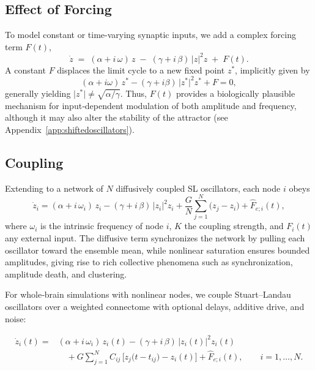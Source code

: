 \documentclass[12pt]{article}
\numberwithin{equation}{section}
\begin{document}
\subsection {Effect of Forcing}
To model constant or time-varying synaptic inputs, we add a complex forcing term $F(t)$,
\begin{equation}
\dot{z} \;=\; (\alpha + i\,\omega)\,z \;-\; (\gamma + i\,\beta)\,\lvert z\rvert^{2}z \;+\; F(t).
\label{eq:sl_forcing}
\end{equation}
A constant \(F\) displaces the limit cycle to a new fixed point \(z^{*}\), implicitly given by
\[
  (\alpha + i\omega)\,z^{*} - (\gamma + i\beta)\,\lvert z^{*}\rvert^{2}z^{*} + F = 0,
\]
generally yielding \(\lvert z^{*}\rvert \neq \sqrt{\alpha/\gamma}\). Thus, \(F(t)\) provides a biologically plausible mechanism for input‐dependent modulation of both amplitude and frequency, although it may also alter the stability of the attractor (see Appendix~\ref{app:shiftedoscillators}).

\subsection {Coupling}
Extending to a network of \(N\) diffusively coupled SL oscillators, each node \(i\) obeys
\begin{equation}
\dot{z}_{i} = (\alpha + i\,\omega_{i})\,z_{i}
             - (\gamma + i\,\beta)\,\lvert z_{i}\rvert^{2}z_{i}
             + \frac{G}{N}\sum_{j=1}^{N}\bigl(z_{j}-z_{i}\bigr)
             + \hat F_{e;i}(t),
\label{eq:sl_coupled}
\end{equation}
where \(\omega_{i}\) is the intrinsic frequency of node \(i\), \(K\) the coupling strength, and \(F_{i}(t)\) any external input. The diffusive term synchronizes the network by pulling each oscillator toward the ensemble mean, while nonlinear saturation ensures bounded amplitudes, giving rise to rich collective phenomena such as synchronization, amplitude death, and clustering.

\noindent
For whole‑brain simulations with nonlinear nodes, we couple Stuart–Landau oscillators over a weighted connectome with optional delays, additive drive, and noise:
\begin{tcolorbox}[
  colback=gray!5,
  colframe=gray!5, %
  boxrule=0pt,     %
  enhanced, sharp corners,
  left=4pt, right=4pt, top=3pt, bottom=3pt,
  boxsep=2pt,
  before skip=6pt, after skip=6pt
]
\begin{equation}
\begin{split}
\dot{z}_i(t)
= {}& (\alpha + i\,\omega_i)\,z_i(t)
      - (\gamma + i\,\beta)\,|z_i(t)|^{2} z_i(t) \\
&\quad + G \sum_{j=1}^{N} C_{ij}\,\bigl[z_j\!\bigl(t-t_{ij}\bigr)-z_i(t)\bigr]
      + \hat F_{e;i}(t), \qquad i=1,\dots,N.
\end{split}
\label{eq:sl_connectome}
\end{equation}
\end{tcolorbox}
\end{document}
